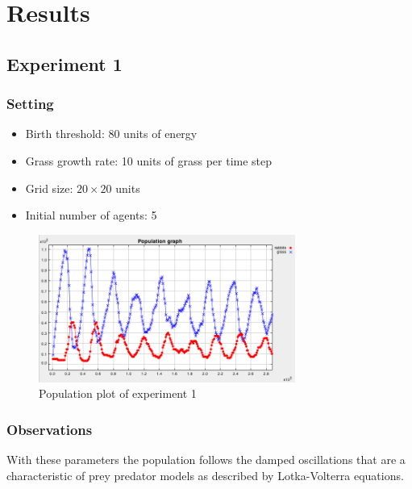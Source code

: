 \documentclass[11pt]{article}
\begin{document}
\section{Results}

\subsection{Experiment 1}

\subsubsection{Setting}
\begin{itemize}
\item Birth threshold: 80 units of energy
\item Grass growth rate: 10 units of grass per time step
\item Grid size: $20\times 20$ units
\item Initial number of agents: 5
\end{itemize}

\begin{figure}[h]
  \caption{Population plot of experiment 1}
  \includegraphics[width=0.75\textwidth]{experiment1}
  \centering
\end{figure}

\subsubsection{Observations}
With these parameters the population follows the damped oscillations that are a
characteristic of prey predator models as described by Lotka-Volterra equations.
\end{document}
